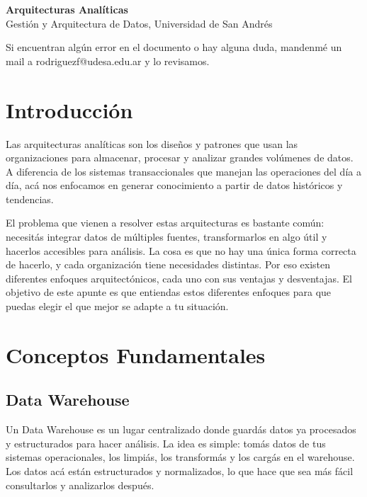 \documentclass[12pt]{article}
\begin{document}
\begin{center}
  {\LARGE \textbf{Arquitecturas Analíticas}}\\[0.5em]
  {Gestión y Arquitectura de Datos, Universidad de San Andrés}
\end{center}

Si encuentran algún error en el documento o hay alguna duda, mandenmé un mail a rodriguezf@udesa.edu.ar y lo revisamos.

\section{Introducción}
Las arquitecturas analíticas son los diseños y patrones que usan las organizaciones para almacenar, procesar y analizar grandes volúmenes de datos. A diferencia de los sistemas transaccionales que manejan las operaciones del día a día, acá nos enfocamos en generar conocimiento a partir de datos históricos y tendencias. 

\vspace{0.5em}

El problema que vienen a resolver estas arquitecturas es bastante común: necesitás integrar datos de múltiples fuentes, transformarlos en algo útil y hacerlos accesibles para análisis. La cosa es que no hay una única forma correcta de hacerlo, y cada organización tiene necesidades distintas. Por eso existen diferentes enfoques arquitectónicos, cada uno con sus ventajas y desventajas. El objetivo de este apunte es que entiendas estos diferentes enfoques para que puedas elegir el que mejor se adapte a tu situación.

\section{Conceptos Fundamentales}

\subsection{Data Warehouse}

Un Data Warehouse es un lugar centralizado donde guardás datos ya procesados y estructurados para hacer análisis. La idea es simple: tomás datos de tus sistemas operacionales, los limpiás, los transformás y los cargás en el warehouse. Los datos acá están estructurados y normalizados, lo que hace que sea más fácil consultarlos y analizarlos después. 

\vspace{0.5em}
\end{document}

